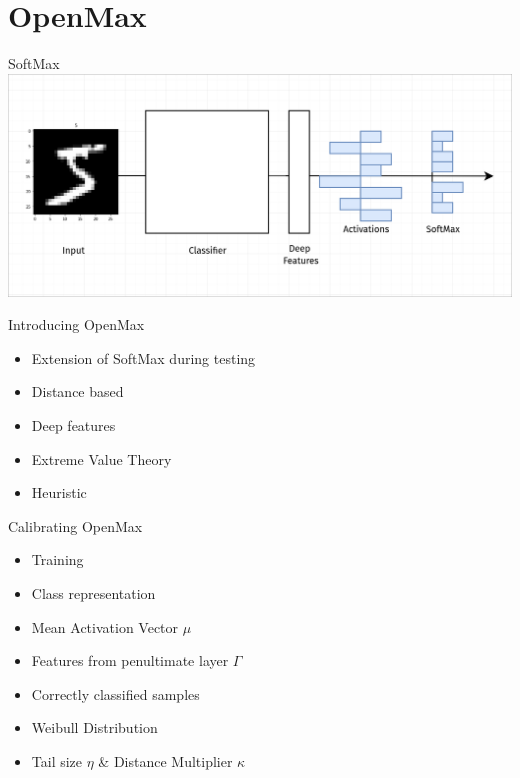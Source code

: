 \section{OpenMax}

\begin{frame}{SoftMax}
	\centering
	\includegraphics[width=\textwidth]{figures/softmax.png}
\end{frame}

\begin{frame}{Introducing OpenMax}
	\begin{itemize}
		\item Extension of SoftMax during testing
		\item Distance based
		\item Deep features
		\item Extreme Value Theory
		\item Heuristic
	\end{itemize}
\end{frame}

\begin{frame}{Calibrating OpenMax}
	\begin{itemize}
		\item Training
		\item Class representation
		\item Mean Activation Vector $\mu$
		\item Features from penultimate layer $\Gamma$
		\item Correctly classified samples
		\item Weibull Distribution
		\item Tail size $\eta$ \& Distance Multiplier $\kappa$
	\end{itemize}
\end{frame}


